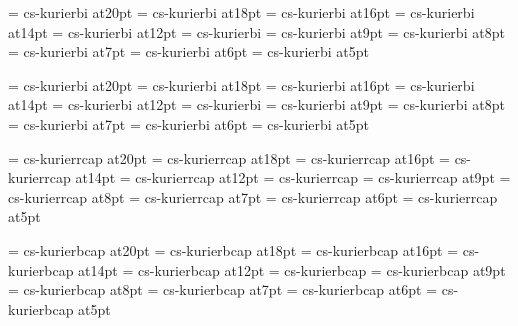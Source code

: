 \font\twentyitbf=      cs-kurierbi at20pt
\font\eighteenitbf=    cs-kurierbi at18pt
\font\sixteenitbf=     cs-kurierbi at16pt
\font\fourteenitbf=    cs-kurierbi at14pt
\font\twelveitbf=      cs-kurierbi at12pt
\font\itbf=            cs-kurierbi
\font\nineitbf=        cs-kurierbi at9pt
\font\eightitbf=       cs-kurierbi at8pt
\font\sevenitbf=       cs-kurierbi at7pt
\font\sixitbf=         cs-kurierbi at6pt
\font\fiveitbf=        cs-kurierbi at5pt

\font\twentyslbf=      cs-kurierbi at20pt
\font\eighteenslbf=    cs-kurierbi at18pt
\font\sixteenslbf=     cs-kurierbi at16pt
\font\fourteenslbf=    cs-kurierbi at14pt
\font\twelveslbf=      cs-kurierbi at12pt
\font\slbf=            cs-kurierbi
\font\nineslbf=        cs-kurierbi at9pt
\font\eightslbf=       cs-kurierbi at8pt
\font\sevenslbf=       cs-kurierbi at7pt
\font\sixslbf=         cs-kurierbi at6pt
\font\fiveslbf=        cs-kurierbi at5pt

\font\twentycaps=      cs-kurierrcap at20pt
\font\eighteencaps=    cs-kurierrcap at18pt
\font\sixteencaps=     cs-kurierrcap at16pt
\font\fourteencaps=    cs-kurierrcap at14pt
\font\twelvecaps=      cs-kurierrcap at12pt
\font\caps=            cs-kurierrcap
\font\ninecaps=        cs-kurierrcap at9pt
\font\eightcaps=       cs-kurierrcap at8pt
\font\sevencaps=       cs-kurierrcap at7pt
\font\sixcaps=         cs-kurierrcap at6pt
\font\fivecaps=        cs-kurierrcap at5pt

\font\twentycapsbf=      cs-kurierbcap at20pt
\font\eighteencapsbf=    cs-kurierbcap at18pt
\font\sixteencapsbf=     cs-kurierbcap at16pt
\font\fourteencapsbf=    cs-kurierbcap at14pt
\font\twelvcsapsbf=      cs-kurierbcap at12pt
\font\capsbf=            cs-kurierbcap
\font\nincsapsbf=        cs-kurierbcap at9pt
\font\eightcapsbf=       cs-kurierbcap at8pt
\font\sevencapsbf=       cs-kurierbcap at7pt
\font\sixcapsbf=         cs-kurierbcap at6pt
\font\fivcsapsbf=        cs-kurierbcap at5pt

\rm 